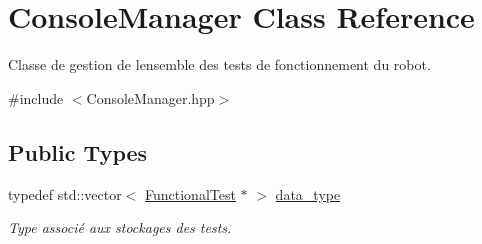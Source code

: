 \hypertarget{classConsoleManager}{}\section{Console\+Manager Class Reference}
\label{classConsoleManager}


Classe de gestion de l\textquotesingle{}ensemble des tests de fonctionnement du robot.  




{\ttfamily \#include $<$Console\+Manager.\+hpp$>$}

\subsection*{Public Types}
\begin{DoxyCompactItemize}
\item 
\mbox{\label{classConsoleManager_a1b4322a881fa74d046e807e288d1a098}} 
typedef std\+::vector$<$ \hyperlink{classFunctionalTest}{Functional\+Test} $\ast$ $>$ \hyperlink{classConsoleManager_a1b4322a881fa74d046e807e288d1a098}{data\+\_\+type}
\begin{DoxyCompactList}\small\item\em Type associé aux stockages des tests. \end{DoxyCompactList}\end{DoxyCompactItemize}
